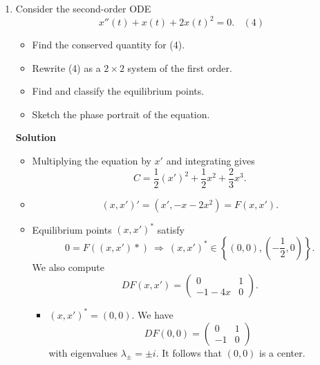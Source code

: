 \documentclass{article}
\begin{document}
\begin{enumerate}
{\bf Solution}

Let
\[f(y) = -y^{1/3}.\]
Notice that \(f\) is continuous; \(f(y) = 0\) precisely when \(y = 0\); and \(f'\) is unbounded in any neighborhood of \(0\), hence cannot be Lipschitz in any neighborhood of \(0\).  Further, \(y(t) \equiv 0\) is the unique solution to \(y'(t) = f(y(t))\) with \(y(0) = 0\), since \(0\) is a stable fixed point for \(f\).



\item Consider the second-order ODE
\[x''(t) + x(t) + 2 x(t)^2 = 0. \ \ \ \ (4)\]

\begin{itemize}
\item Find the conserved quantity for (4).

\item Rewrite (4) as a \(2 \times 2\) system of the first order.

\item Find and classify the equilibrium points.

\item Sketch the phase portrait of the equation.

\end{itemize}

{\bf Solution}

\begin{itemize}
\item Multiplying the equation by \(x'\) and integrating gives
\[C = \frac{1}{2} \left( x' \right)^2 + \frac{1}{2} x^2 + \frac{2}{3} x^3.\]

\item
\[(x,x')' = (x', -x - 2 x^2) = F(x,x').\]

\item Equilibrium points \((x,x')^*\) satisfy
\[0 = F((x,x')*) \ \Rightarrow \ (x,x')^* \in \left\{ (0,0), \left( -\frac{1}{2}, 0 \right) \right\}.\]
We also compute
\[DF(x,x') = \left( \begin{array}{cc} 0 & 1 \\ -1 - 4 x & 0 \end{array} \right).\]

\begin{itemize}
\item \((x,x')^* = (0,0)\).  We have
\[DF(0,0) = \left( \begin{array}{cc} 0 & 1 \\ -1 & 0 \end{array} \right)\]
with eigenvalues \(\lambda_{\pm} = \pm i\).  It follows that \((0,0)\) is a center.


\end{itemize}
\end{itemize}
\end{enumerate}
\end{document}
